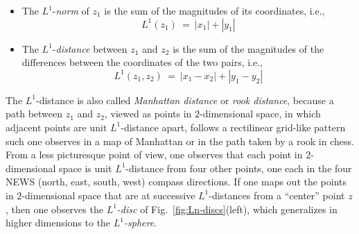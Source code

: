 \begin{itemize}
\item
The $L^1$-{\it norm} of $z_1$ is the sum of the magnitudes of its coordinates, i.e.,
\[ L^1(z_1) \ = \ |x_1| + |y_1|  \]  

\item
The $L^1$-{\it distance} between $z_1$ and $z_2$ is the sum of the magnitudes of the differences between the coordinates of the two pairs, i.e.,
\[ L^1(z_1, z_2) \ = \ |x_1 - x_2| + |y_1 - y_2| \]
\end{itemize}
The $L^1$-distance is also called {\it Manhattan distance} or {\it rook distance}, because a path between $z_1$ and $z_2$, viewed as points in $2$-dimensional space, in which adjacent points are unit $L^1$-distance apart, follows a rectilinear grid-like pattern such one observes in a map of Manhattan or in the path taken by a rook in chess.  From a less picturesque point of view, one observes that each point in $2$-dimensional space is unit $L^1$-distance from four other points, one each in the four NEWS (north, east, south, west) compass directions.  If one maps out the points in $2$-dimensional space that are at successive $L^1$-distances from a ``center'' point $z$, then one observes the {\it $L^1$-disc} of Fig.~\ref{fig:Ln-discs}(left), which generalizes in higher dimensions to the {\it $L^1$-sphere}.  
